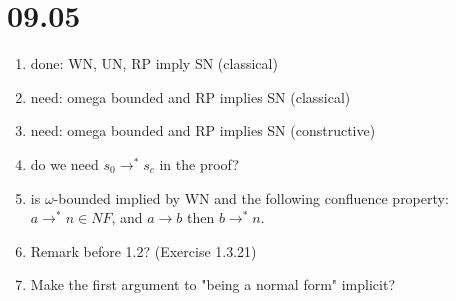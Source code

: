 \documentclass{scrartcl}
\begin{document}
\section{09.05}
\begin{enumerate}
  \item done: WN, UN, RP imply SN (classical)
  \item need: omega bounded and RP implies SN (classical)
  \item need: omega bounded and RP implies SN (constructive)
  \item do we need $s_0 \to^* s_c$ in the proof?
  \item is $\omega$-bounded implied by WN and the following confluence property:
  $a \to^* n \in NF$, and $a \to b$ then $b \to^* n $.
  \item Remark before 1.2? (Exercise 1.3.21)
  \item Make the first argument to "being a normal form" implicit?
\end{enumerate}

\newcommand{\RP}{\mathsf{RP}}
\newcommand{\NF}{\mathsf{NF}}
\newcommand{\UN}{\mathsf{UN}}
\newcommand{\UNto}{\mathsf{UN}{\to}}
\newcommand{\SN}{\mathsf{SN}}
\newcommand{\WN}{\mathsf{WN}}
\newcommand{\from}{\leftarrow}
\end{document}
